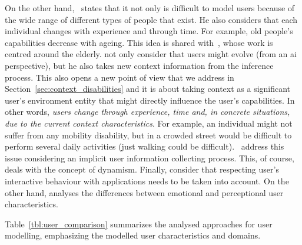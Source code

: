 On the other hand,~\citet{fischer_user_2001} states that it not only is 
difficult to model users because of the wide range of different types of people 
that exist. He also considers that each individual changes with experience and 
through time. For example, old people's capabilities decrease with ageing. This
idea is shared with~\citet{gregor_designing_2002}, whose work is centred around
the elderly. \citet{heckmann_gumogeneral_2005} not only consider that users 
might evolve (from an \ac{ai} perspective), but he also takes new context 
information from the inference process. This also opens a new point of view 
that we address in Section~\ref{sec:context_disabilities} and it is about taking 
context as a significant user's environment entity that might directly influence 
the user's capabilities. In other words, \textit{users change through experience, 
time and, in concrete situations, due to the current context characteristics}. For 
example, an individual might not suffer from any mobility disability, but in a 
crowded street would be difficult to perform several daily activities (just 
walking could be difficult).~\citet{razmerita_ontology_based_2003} address 
this issue considering an implicit user information collecting process. This, 
of course, deals with the concept of dynamism. Finally, \citet{evers_achieving_2012} 
consider that respecting user's interactive behaviour with applications needs to 
be taken into account. On the other hand, \citet{pereira_triple_2005} analyses 
the differences between emotional and perceptional user characteristics. 


Table~\ref{tbl:user_comparison} summarizes the analysed approaches for user
modelling, emphasizing the modelled user characteristics and domains. 




